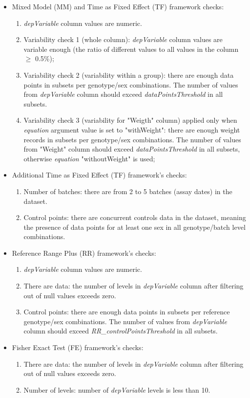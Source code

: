 \documentclass[a4paper]{article}
\begin{document}
\begin{itemize}
\item Mixed Model (MM) and Time as Fixed Effect (TF) framework checks:
\begin{enumerate}
\item \textit{depVariable} column values are numeric.
\item Variability check 1  (whole column): \textit{depVariable} column values are variable enough (the ratio of different values to all values in the column $\geq$ 0.5\%);
\item Variability check 2 (variability within a group): there are enough data points in subsets per genotype/sex combinations. The number of values from \textit{depVariable} column should exceed \textit{dataPointsThreshold} in all subsets.
\item Variability check 3 (variability for "Weigth" column) applied only when \textit{equation} argument value is set to "withWeight": there are enough weight records in subsets per genotype/sex combinations. The number of values from "Weight" column should exceed \textit{dataPointsThreshold} in all subsets, otherwise \textit{equation} "withoutWeight" is used;
\end{enumerate}
\item Additional Time as Fixed Effect (TF) framework's checks:
\begin{enumerate}
\item Number of batches: there are from 2 to 5 batches (assay dates) in the dataset.
\item Control points: there are concurrent controls data in the dataset, meaning the presence of data points for at least one sex in all genotype/batch level combinations.
\end{enumerate}
\item Reference Range Plus (RR) framework's checks:
\begin{enumerate}
\item \textit{depVariable} column values are numeric.
\item There are data: the number of levels in \textit{depVariable} column after filtering out of null values exceeds zero. 
\item Control points: there are enough data points in subsets per reference genotype/sex combinations. The number of values from \textit{depVariable} column should exceed \textit{RR\_controlPointsThreshold} in all subsets. 
\end{enumerate}
\item Fisher Exact Test (FE) framework's checks: 
\begin{enumerate}
\item There are data: the number of levels in \textit{depVariable} column after filtering out of null values exceeds zero.
\item Number of levels: number of \textit{depVariable} levels is less than 10.
\end{enumerate}
\end{itemize}
\end{document}
